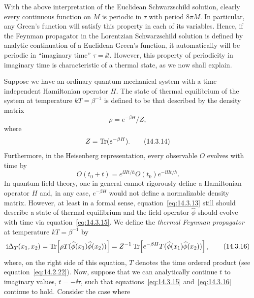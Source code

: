 With the above interpretation of the Euclidean Schwarzschild solution, clearly
every continuous function on \(M\) is periodic in \(\tau\) with period \(8\pi M\).
In particular, any Green's function will satisfy this property in each of its variables.
Hence, if the Feynman propagator in the Lorentzian Schwarzschild solution is defined
by analytic continuation of a Euclidean Green's function, it automatically will be
periodic in ``imaginary time'' \(\tau=\ii t\). However, this property of periodicity in
imaginary time is characteristic of a thermal state, as we now shall explain.

Suppose we have an ordinary quantum mechanical system with a time independent
Hamiltonian operator \(H\). The state of thermal equilibrium of the system at
temperature \(kT=\beta^{-1}\) is defined to be that described by the density matrix
\begin{equation}
  \rho=e^{-\beta H}/Z,
  \tag{14.3.13}\label{eq:14.3.13}
\end{equation}
where
\begin{equation}
  Z=\operatorname{Tr}(e^{-\beta H}).
  \tag{14.3.14}\label{eq:14.3.14}
\end{equation}
Furthermore, in the Heisenberg representation, every observable \(O\) evolves with
time by
\begin{equation}
  O(t_0+t)=e^{\ii Ht/\hbar}O(t_0)e^{-\ii Ht/\hbar}.
  \tag{14.3.15}\label{eq:14.3.15}
\end{equation}
In quantum field theory, one in general cannot rigorously define a Hamiltonian
operator \(H\) and, in any case, \(e^{-\beta H}\) would not define a normalizable
density matrix. However, at least in a formal sense, equation~\eqref{eq:14.3.13}
still should describe a state of thermal equilibrium and the field operator
\(\widehat\phi\) should evolve with time via equation~\eqref{eq:14.3.15}. We
define the \emph{thermal Feynman propagator} at temperature \(kT=\beta^{-1}\) by
\begin{equation}
  \mathrm{i}\Delta_T(x_1,x_2)
  =\operatorname{Tr}\!\left[\rho T(\widehat\phi(x_1)\widehat\phi(x_2))\right]
  =Z^{-1}\operatorname{Tr}\!\left[e^{-\beta H}
    T(\widehat\phi(x_1)\widehat\phi(x_2))\right],
  \tag{14.3.16}\label{eq:14.3.16}
\end{equation}
where, on the right side of this equation, \(T\) denotes the time ordered product
(see equation~\eqref{eq:14.2.22}). Now, suppose that we can analytically continue
\(t\) to imaginary values, \(t=-\ii\tau\), such that equations~\eqref{eq:14.3.15}
and~\eqref{eq:14.3.16} continue to hold. Consider the case where
